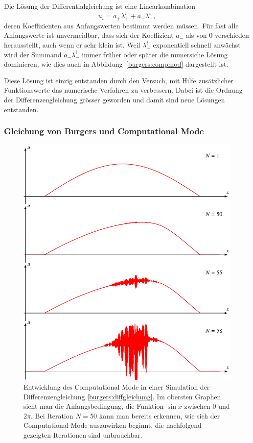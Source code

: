 Die Lösung der Differentialgleichung ist eine Linearkombination
\[
u_i = a_+\lambda_+^i + a_-\lambda_-^i,
\]
deren Koeffizienten aus Anfangswerten bestimmt werden müssen.
Für fast alle Anfangswerte ist unvermeidbar, dass sich der
Koeffizient $a_-$ als von $0$ verschieden herausstellt, auch
wenn er sehr klein ist.
Weil $\lambda_-^i$ exponentiell schnell anwächst wird der Summand
$a_-\lambda_-^i$ immer früher oder später die numersiche Lösung dominieren,
wie dies auch in Abbildung~\ref{burgers:compmod} dargestellt ist.

Diese Lösung ist einzig entstanden durch den Versuch, mit Hilfe zusätzlicher
Funktionswerte das numerische Verfahren zu verbessern.
Dabei ist die Ordnung der Differenzengleichung grösser geworden und damit
sind neue Lösungen entstanden.

\subsubsection{Gleichung von Burgers und Computational Mode}
\begin{figure}
\centering
\includegraphics{learning/burgerwave.pdf}
\caption{Entwicklung des Computational Mode in einer Simulation
der Differenzengleichung \eqref{burgers:diffgleichung}.
Im obersten Graphen sieht man die Anfangsbedingung, die Funktion $\sin x$
zwischen $0$ und $2\pi$.
Bei Iteration $N=50$ kann man bereits erkennen, wie sich der Computational
Mode auszuwirken beginnt, die nachfolgend gezeigten Iterationen sind
unbrauchbar.
\label{burgers:burgerwave}}
\end{figure}
